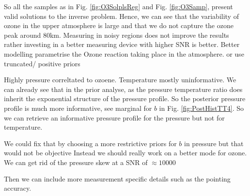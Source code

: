 So all the samples as in Fig. \ref{fig:O3SolplsReg} and Fig. \ref{fig:O3Samp}, present valid solutions to the inverse problem.
Hence, we can see that the variability of ozone in the upper atmosphere is large and that we do not capture the ozone peak around $80$km.
Measuring in noisy regions does not improve the results rather investing in a better measuring device with higher SNR is better.
Better modelling parametrise the Ozone reaction taking place in the atmosphere. or use truncated/ positive priors

Highly pressure correltated to ozoene.
Temperature mostly uninformative.
We can already see that in the prior analyse, as the pressure temperature ratio does inherit the exponential structure of the pressure profile.
So the posterior pressure profile is much more informative, see marginal for $b$ in Fig. \ref{fig:PostHistTT4}. 
So we can retrieve an informative pressure profile for the pressure but not for temperature.


We could fix that by choosing a more restrictive priors for $b$ in pressure but that would not be objective 
Instead we should really work on a better mode for ozone.
We can get rid of the pressure skew at a SNR of $\approx 10000$

Then we can include more measurement specific details such as the pointing accuracy.


